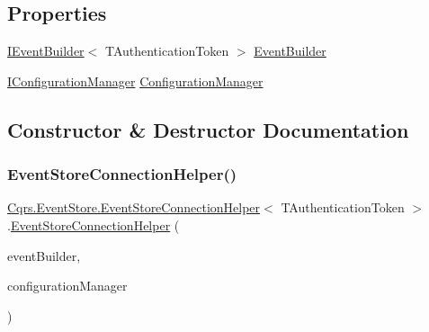 \subsection*{Properties}
\begin{DoxyCompactItemize}
\item 
\hyperlink{interfaceCqrs_1_1EventStore_1_1IEventBuilder}{I\+Event\+Builder}$<$ T\+Authentication\+Token $>$ \hyperlink{classCqrs_1_1EventStore_1_1EventStoreConnectionHelper_a0658657c13dd7edfaca4837e39fd86dd_a0658657c13dd7edfaca4837e39fd86dd}{Event\+Builder}
\item 
\hyperlink{interfaceCqrs_1_1Configuration_1_1IConfigurationManager}{I\+Configuration\+Manager} \hyperlink{classCqrs_1_1EventStore_1_1EventStoreConnectionHelper_aa518bbaa1cd7d75a57429c3cf4dd4f96_aa518bbaa1cd7d75a57429c3cf4dd4f96}{Configuration\+Manager}
\end{DoxyCompactItemize}


\subsection{Constructor \& Destructor Documentation}
\mbox{\label{classCqrs_1_1EventStore_1_1EventStoreConnectionHelper_ac9d232e255275c70aee4465b08e7fd79_ac9d232e255275c70aee4465b08e7fd79}} 
\subsubsection{\texorpdfstring{Event\+Store\+Connection\+Helper()}{EventStoreConnectionHelper()}}
{\footnotesize\ttfamily \hyperlink{classCqrs_1_1EventStore_1_1EventStoreConnectionHelper}{Cqrs.\+Event\+Store.\+Event\+Store\+Connection\+Helper}$<$ T\+Authentication\+Token $>$.\hyperlink{classCqrs_1_1EventStore_1_1EventStoreConnectionHelper}{Event\+Store\+Connection\+Helper} (\begin{DoxyParamCaption}\item[{\hyperlink{interfaceCqrs_1_1EventStore_1_1IEventBuilder}{I\+Event\+Builder}$<$ T\+Authentication\+Token $>$}]{event\+Builder,  }\item[{\hyperlink{interfaceCqrs_1_1Configuration_1_1IConfigurationManager}{I\+Configuration\+Manager}}]{configuration\+Manager }\end{DoxyParamCaption})}



